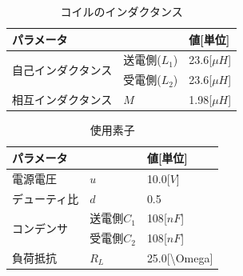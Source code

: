 \documentclass[12pt]{jarticle}
\begin{document}
\begin{table}[h]
	\centering
	\caption{コイルのインダクタンス}
	\label{tab:indact}
	\begin{tabular}{|l|l|l|}
		\hline
		\multicolumn{2}{|l|}{パラメータ}             & 値{[}単位{]}       \\ \hline
		\multirow{2}{*}{自己インダクタンス} & 送電側($L_1$) & 23.6{[}$\mu H${]} \\ \cline{2-3} 
		& 受電側($L_2$) & 23.6{[}$\mu H${]} \\ \hline
		相互インダクタンス                  & $M$        & 1.98{[}$\mu H${]} \\ \hline
	\end{tabular}
\end{table}
\begin{table}[h]
	\centering
	\caption{使用素子}
	\label{tab:sosi}
	\begin{tabular}{|l|l|l|}
		\hline
		\multicolumn{2}{|l|}{パラメータ}       & 値{[}単位{]}                       \\ \hline
		電源電圧                   & $u$      & 10.0{[}$V${]}                   \\ \hline
		デューティ比                 & $d$      & 0.5                             \\ \hline
		\multirow{2}{*}{コンデンサ} & 送電側$C_1$ & 108{[}$nF${]}                   \\ \cline{2-3} 
		& 受電側$C_2$ & 108{[}$nF${]}                   \\ \hline
		負荷抵抗                   & $R_L$    & 25.0{[}\textbackslash{}Omega{]} \\ \hline
	\end{tabular}
\end{table}
\clearpage
\end{document}
